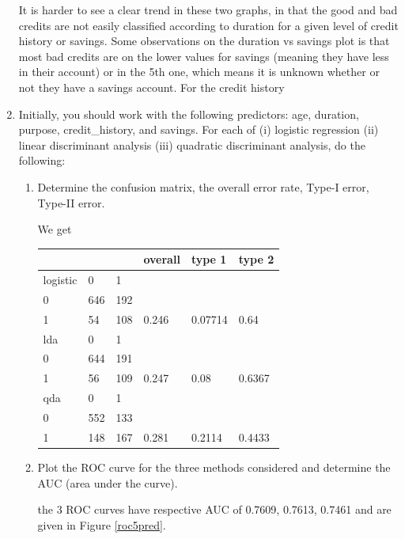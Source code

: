 \documentclass[11pt]{article}
\begin{document}
\begin{enumerate}
  It is harder to see a clear trend in these two graphs, in that the good and bad credits are not easily classified according to duration for a given level of credit history or savings. Some observations on the duration vs savings plot is that most bad credits are on the lower values for savings (meaning they have less in their account) or in the 5th one, which means it is unknown whether or not they have a savings account. For the credit history
  
\item Initially, you should work with the following predictors: age, duration, purpose, credit\_history, and savings. For each of (i) logistic regression (ii) linear discriminant analysis (iii) quadratic discriminant analysis, do the following:
  \begin{enumerate}
  \item Determine the confusion matrix, the overall error rate, Type-I error, Type-II error.

     We get

    \begin{tabular}{| lll | lll |}
    \hline
   &&&overall&type 1& type 2\\   
    \hline
  logistic    &         0 &  1 &&&\\
  \hline
  0 &646& 192&&&\\
  1  & 54&  108&0.246&0.07714&0.64\\
  \hline
   lda    & 0&   1&&&\\
   \hline
  0 &644& 191&&&\\
  1 & 56& 109 &0.247&0.08&  0.6367\\
  \hline
qda    & 0 &  1 &&&\\
\hline
  0 &552& 133 &&&\\
  1 &148& 167 & 0.281 &0.2114 & 0.4433\\
  \hline
  \end{tabular}

    
  \item Plot the ROC curve for the three methods considered and determine the AUC (area under the curve).

     the 3 ROC curves have respective AUC of 0.7609, 0.7613, 0.7461 and are given in Figure \ref{roc5pred}.


\end{enumerate}
\end{enumerate}
\end{document}
